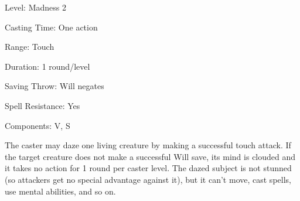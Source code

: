 
\begin{description*}
\item[Level:] Madness 2
\item[Casting Time:] One action
\item[Range:] Touch
\item[Duration:] 1 round/level
\item[Saving Throw:] Will negates
\item[Spell Resistance:] Yes
\item[Components:] V, S
\end{description*}

The caster may daze one living creature by making a successful touch attack. If
the target creature does not make a successful Will save, its mind is clouded and
it takes no action for 1 round per caster level. The dazed subject is not stunned
(so attackers get no special advantage against it), but it can't move, cast spells,
use mental abilities, and so on.